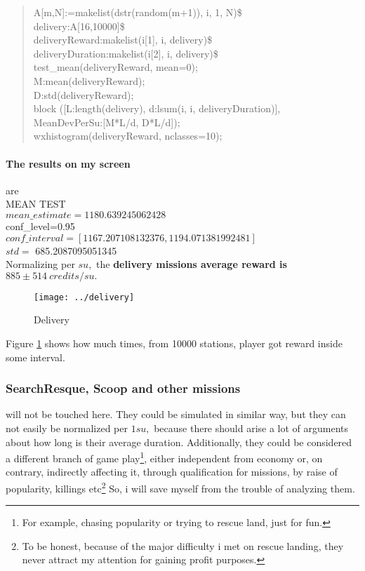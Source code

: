 \documentclass[]{article}
\begin{document}
\begin{quote}
A[m,N]:=makelist(dstr(random(m+1)), i, 1, N)\$\\
delivery:A[16,10000]\$\\
deliveryReward:makelist(i[1], i, delivery)\$\\
deliveryDuration:makelist(i[2], i, delivery)\$\\
test\_mean(deliveryReward, mean=0);\\
M:mean(deliveryReward);\\
D:std(deliveryReward);\\
block ([L:length(delivery), d:lsum(i, i, deliveryDuration)],\\
MeanDevPerSu:[M*L/d, D*L/d]);\\
wxhistogram(deliveryReward, nclasses=10);
\end{quote}
\paragraph*{The results on my screen} are\\
MEAN TEST\\
$mean\_estimate=1180.639245062428$\\
conf\_level=0.95\\
$conf\_interval=[1167.207108132376,1194.071381992481]$\\
$std=$ 685.2087095051345\\

Normalizing per $su,$ the \textbf{delivery missions average reward is $885\pm514\ credits/su.$}
\begin{figure}[h]
	\centering
	\texttt{[image: ../delivery]}
	\caption{Delivery}
	\label{fig:delivery}
\end{figure}

Figure \ref{fig:delivery} shows how much times, from 10000 stations, player got reward inside some interval.

\subsubsection{SearchResque, Scoop and other missions} will not be touched here. They could be simulated in similar way, but they can not easily be normalized per $1su,$ because there should arise a lot of arguments about how long is their average duration. Additionally, they could be considered a different branch of game play\footnote{For example, chasing popularity or trying to rescue land,  just for fun.}, either independent from economy or, on contrary, indirectly affecting it, through qualification for missions, by raise of popularity, killings etc\footnote{To be honest, because of the major difficulty i met on rescue landing, they never attract my attention for gaining profit purposes.} So, i will save myself from the trouble of analyzing them.
\end{document}
